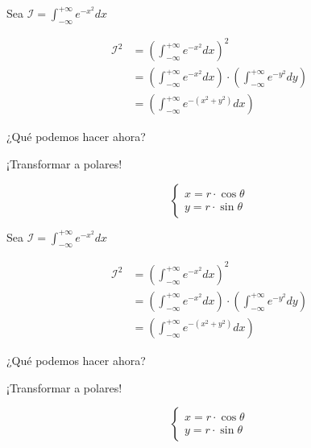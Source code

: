 \begin{frame}[fragile]
    \begin{center}
    Sea $\mathcal{I} = \int_{- \infty}^{+ \infty}{e^{-x^2}dx}$
    \end{center}
    \begin{align*}
        \mathcal{I}^2 &= \left ( \int_{- \infty}^{+ \infty}{e^{-x^2}dx} \right )^2 \\
        &= \left ( \int_{- \infty}^{+ \infty}{e^{-x^2}dx} \right ) \cdot \left ( \int_{- \infty}^{+ \infty}{e^{-y^2}dy} \right ) \\
        &= \left ( \int_{- \infty}^{+ \infty}{e^{-(x^2 + y^2)}dx} \right )
    \end{align*}
    \begin{center}
    ¿Qué podemos hacer ahora?
    \end{center}

    \begin{center}
    ¡Transformar a polares!
    \end{center}
    $$
    \begin{cases}
        x = r \cdot \cos{\theta} \\
        y = r \cdot \sin{\theta}
    \end{cases}
    $$
\end{frame}

\begin{frame}[fragile]
    \begin{center}
    Sea $\mathcal{I} = \int_{- \infty}^{+ \infty}{e^{-x^2}dx}$
    \end{center}
    \begin{align*}
        \mathcal{I}^2 &= \left ( \int_{- \infty}^{+ \infty}{e^{-x^2}dx} \right )^2 \\
        &= \left ( \int_{- \infty}^{+ \infty}{e^{-x^2}dx} \right ) \cdot \left ( \int_{- \infty}^{+ \infty}{e^{-y^2}dy} \right ) \\
        &= \left ( \int_{- \infty}^{+ \infty}{e^{-(x^2 + y^2)}dx} \right )
    \end{align*}
    \begin{center}
    ¿Qué podemos hacer ahora?
    \end{center}
    \begin{center}
    ¡Transformar a polares!
    \end{center}
    $$
    \begin{cases}
        x = r \cdot \cos{\theta} \\
        y = r \cdot \sin{\theta}
    \end{cases}
    $$
\end{frame}

